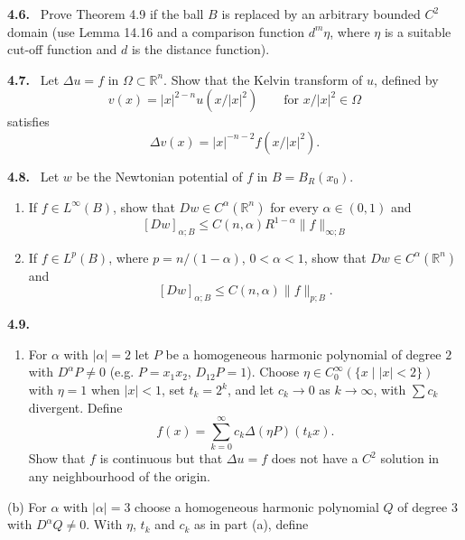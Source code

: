 \medskip

\noindent\textbf{4.6.} \ Prove Theorem 4.9 if the ball \(B\) is replaced by an arbitrary bounded \(C^2\) domain (use Lemma 14.16 and a comparison function \(d^m\eta\), where \(\eta\) is a suitable cut-off function and \(d\) is the distance function).

\medskip

\noindent\textbf{4.7.} \ Let \(\Delta u = f\) in \(\Omega \subset \mathbb{R}^n\). Show that the Kelvin transform of \(u\), defined by
\[
v(x)=\lvert x\rvert^{2-n}u(x/\lvert x\rvert^2)\qquad\text{for } x/\lvert x\rvert^2 \in \Omega
\]
satisfies
\[
\Delta v(x)=\lvert x\rvert^{-n-2}f(x/\lvert x\rvert^2).
\]

\medskip

\noindent\textbf{4.8.} \ Let \(w\) be the Newtonian potential of \(f\) in \(B = B_R(x_0)\).
\begin{enumerate}
\item[(a)] If \(f \in L^\infty(B)\), show that \(Dw \in C^\alpha(\mathbb{R}^n)\) for every \(\alpha \in (0,1)\) and
\[
[Dw]_{\alpha;B} \le C(n,\alpha)R^{1-\alpha}\lVert f\rVert_{\infty;B}
\]
\item[(b)] If \(f \in L^p(B)\), where \(p = n/(1-\alpha)\), \(0<\alpha<1\), show that \(Dw \in C^\alpha(\mathbb{R}^n)\) and
\[
[Dw]_{\alpha;B} \le C(n,\alpha)\lVert f\rVert_{p;B}.
\]
\end{enumerate}

\medskip

\noindent\textbf{4.9.}
\begin{enumerate}
\item[(a)] For \(\alpha\) with \(\lvert \alpha\rvert = 2\) let \(P\) be a homogeneous harmonic polynomial of degree \(2\) with \(D^\alpha P \neq 0\) (e.g. \(P = x_1x_2\), \(D_{12}P = 1\)). Choose \(\eta \in C_0^\infty(\{x\mid \lvert x\rvert < 2\})\) with \(\eta = 1\) when \(\lvert x\rvert < 1\), set \(t_k = 2^k\), and let \(c_k \to 0\) as \(k \to \infty\), with \(\sum c_k\) divergent. Define
\[
f(x)=\sum_{k=0}^\infty c_k \Delta(\eta P)(t_kx).
\]
Show that \(f\) is continuous but that \(\Delta u = f\) does not have a \(C^2\) solution in any neighbourhood of the origin.
\end{enumerate}


(b) For $\alpha$ with $|\alpha|=3$ choose a homogeneous harmonic polynomial $Q$ of degree $3$ with $D^\alpha Q\neq 0$. With $\eta$, $t_k$ and $c_k$ as in part (a), define

